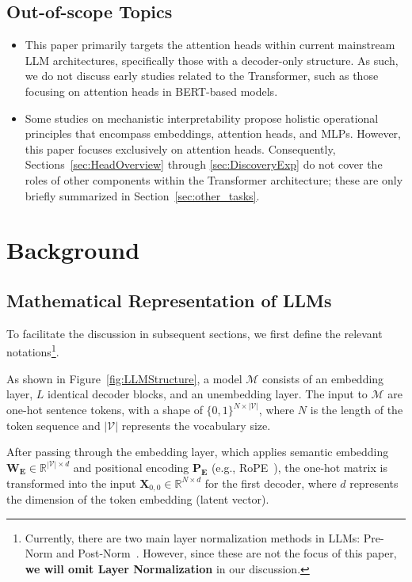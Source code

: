 \documentclass{article}
\begin{document}
\subsection{Out-of-scope Topics}
\begin{itemize}
    \item This paper primarily targets the attention heads within current mainstream LLM architectures, specifically those with a decoder-only structure. As such, we do not discuss early studies related to the Transformer, such as those focusing on attention heads in BERT-based models.
    \item Some studies on mechanistic interpretability propose holistic operational principles that encompass embeddings, attention heads, and MLPs. However, this paper focuses exclusively on attention heads. Consequently, Sections~\ref{sec:HeadOverview} through \ref{sec:DiscoveryExp} do not cover the roles of other components within the Transformer architecture; these are only briefly summarized in Section~\ref{sec:other_tasks}.
\end{itemize}


\section{Background} \label{sec:background}
\subsection{Mathematical Representation of LLMs} \label{subsec:Math}
To facilitate the discussion in subsequent sections, we first define the relevant notations\footnote{Currently, there are two main layer normalization methods in LLMs: Pre-Norm and Post-Norm~\citep{liu-etal-2020-understanding, xiong2020layer}. However, since these are not the focus of this paper, \textbf{we will omit Layer Normalization} in our discussion.}.

As shown in Figure~\ref{fig:LLMStructure}, a model $\mathcal{M}$ consists of an embedding layer, $L$ identical decoder blocks, and an unembedding layer. The input to $\mathcal{M}$ are one-hot sentence tokens, with a shape of $\{0,1\}^{N \times |\mathcal{V}|}$, where $N$ is the length of the token sequence and $|\mathcal{V}|$ represents the vocabulary size.

After passing through the embedding layer, which applies semantic embedding $\mathbf{W_{E}} \in \mathbb{R}^{|\mathcal{V}| \times d}$ and positional encoding $\mathbf{P_{E}}$ (e.g., RoPE~\citep{ROPE_24_Neuro_Zhuiyi}), the one-hot matrix is transformed into the input $\mathbf{X}_{0,0} \in \mathbb{R}^{N \times d}$ for the first decoder, where $d$ represents the dimension of the token embedding (latent vector).
\end{document}
